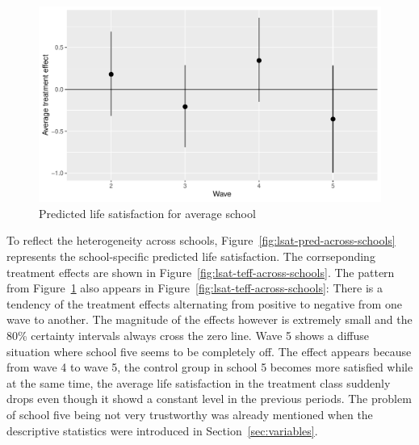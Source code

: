 \documentclass[a4, 12pt]{article}
\begin{document}
\begin{figure}[H]

{\centering \includegraphics[width=0.8\linewidth,]{../figures/lsat_teff} 

}

\caption{Predicted life satisfaction for average school}\label{fig:lsat-teff}
\end{figure}

To reflect the heterogeneity across schools, Figure~\ref{fig:lsat-pred-across-schools} represents the school-specific predicted life satisfaction. The corrseponding treatment effects are shown in Figure~\ref{fig:lsat-teff-across-schools}. The pattern from Figure~\ref{fig:lsat-teff} also appears in Figure~\ref{fig:lsat-teff-across-schools}: There is a tendency of the treatment effects alternating from positive to negative from one wave to another. The magnitude of the effects however is extremely small and the 80\% certainty intervals always cross the zero line. Wave 5 shows a diffuse situation where school five seems to be completely off. The effect appears because from wave 4 to wave 5, the control group in school 5 becomes more satisfied while at the same time, the average life satisfaction in the treatment class suddenly drops even though it showd a constant level in the previous periods. The problem of school five being not very trustworthy was already mentioned when the descriptive statistics were introduced in Section~\ref{sec:variables}.
\end{document}
